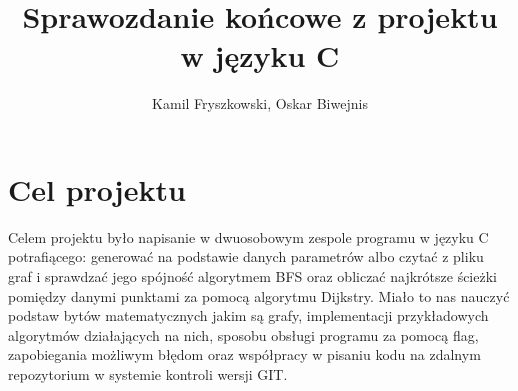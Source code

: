 \documentclass{article}
\title{Sprawozdanie końcowe z projektu w języku C}
\author{Kamil Fryszkowski, Oskar Biwejnis}
\begin{document}
\maketitle
\thispagestyle{fancy}

\section{Cel projektu} 
Celem projektu było napisanie w dwuosobowym zespole programu w języku C potrafiącego: generować na podstawie danych parametrów albo czytać z pliku graf i sprawdzać jego spójność algorytmem BFS oraz obliczać najkrótsze ścieżki pomiędzy danymi punktami za pomocą algorytmu Dijkstry. Miało to nas nauczyć podstaw bytów matematycznych jakim są grafy, implementacji przykładowych algorytmów działających na nich, sposobu obsługi programu za pomocą flag, zapobiegania możliwym błędom oraz współpracy w pisaniu kodu na zdalnym repozytorium w systemie kontroli wersji GIT.
\end{document}
